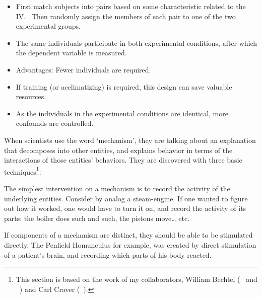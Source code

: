 \begin{refsection}
\begin{itemize}
\end{itemize}


\begin{itemize}
\item First match subjects into pairs based on some characteristic related to the IV.  Then randomly assign the members of each pair to one of the two experimental groups.

\item The same individuals participate in both experimental conditions, after which the dependent variable is measured.

\item Advantages: Fewer individuals are required.

\item If training (or acclimatizing) is required, this design can save valuable resources.

\item As the individuals in the experimental conditions are identical, more confounds are controlled.

\end{itemize}

When scientists use the word `mechanism', they are talking about an explanation that decomposes into other entities, and explains behavior in terms of the interactions of those entities' behaviors. They are discovered with three basic techniques\footnote{This section is based on the work of my collaborators, William Bechtel (~\citep{Bechtel:2010we} and ~\citep{Bechtel:OYBoWb_-}) and Carl Craver (~\citep{Craver:2006ti}).}:

 The simplest intervention on a mechanism is to record the activity of the underlying entities. Consider by analog a steam-engine. If one wanted to figure out how it worked, one would have to turn it on, and record the activity of its parts: the boiler does such and such, the pistons move{\ldots} etc.

 If components of a mechanism are distinct, they should be able to be stimulated directly. The Penfield Homunculus for example, was created by direct stimulation of a patient's brain, and recording which parts of his body reacted.\begin{marginfigure}
 \begin{center}


\end{center}
\end{marginfigure}
\end{refsection}
